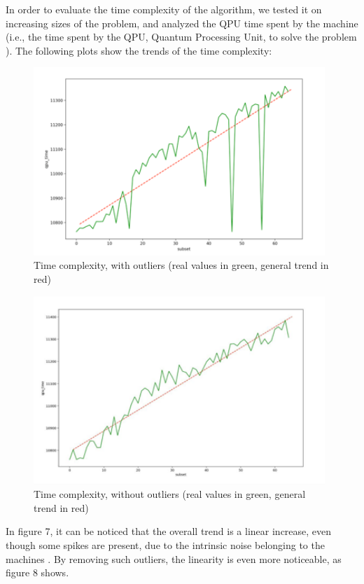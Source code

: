 \documentclass[oneside,a4paper]{article}
\begin{document}
In order to evaluate the time complexity of the algorithm, we tested it on increasing sizes of the problem, and analyzed the QPU time spent by the machine (i.e., the time spent by the QPU, Quantum Processing Unit, to solve the problem \cite{WebSite13}). The following plots show the trends of the time complexity:
\newpage

\begin{figure}[htp]
\centering
\includegraphics[width=11cm]{LaTeXTemplate/Images/2000QfirstT1.png}
\caption{Time complexity, with outliers (real values in green, general trend in red)}
\end{figure}
\begin{figure}[htp]
\centering
\includegraphics[width=11cm]{LaTeXTemplate/Images/2000QfirstT2.png}
\caption{Time complexity, without outliers (real values in green, general trend in red)}
\end{figure}

In figure 7, it can be noticed that the overall trend is a linear increase, even though some spikes are present, due to the intrinsic noise belonging to the machines \cite{WebSite14}. By removing such outliers, the linearity is even more noticeable, as figure 8 shows.
\\
\\
\newpage
\end{document}
